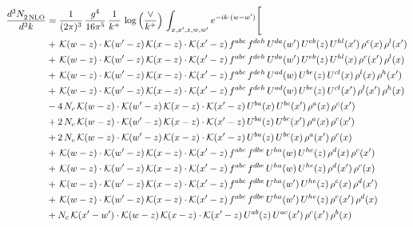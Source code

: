 \documentclass[9pt]{article}
\numberwithin{equation}{section}
\begin{document}
\begin{align}
    \frac{d^{3}N_{2\,\rm NLO}^{\rm}}{d^{3}k}  & = \frac{1}{(2\pi)^{3}}\,\frac{g^{4}}{16\pi^{5}}\,\frac{1}{k^{+}}\,\log{\left(\frac{\vee}{k^{+}}\right)}\, \int_{x,x',z,w,w'}e^{-ik\cdot (w-w')}\Bigg[\notag\\ &
    +\,\mathcal{K}(w-z)\cdot\mathcal{K}(w'-z)\,\mathcal{K}(x-z)\cdot\mathcal{K}(x'-z)\,f^{abc}\,f^{deh}\,U^{da}(w')\,U^{eb}(z)\,U^{hl}(x')\,\rho^{c}(x)\,\rho^{l}(x')\notag \\
&+\,\mathcal{K}(w-z)\cdot\mathcal{K}(w'-z)\,\mathcal{K}(x-z)\cdot\mathcal{K}(x'-z)\,f^{abc}\,f^{deh}\,U^{da}(w')\,U^{eb}(z)\,U^{hl}(x)\,\rho^{c}(x')\,\rho^{l}(x)\notag \\
&+\,\mathcal{K}(w-z)\cdot\mathcal{K}(w'-z)\,\mathcal{K}(x-z)\cdot\mathcal{K}(x'-z)\,f^{abc}\,f^{deh}\,U^{ad}(w)\,U^{be}(z)\,U^{cl}(x)\,\rho^{l}(x)\,\rho^{h}(x')\notag \\
&+\,\mathcal{K}(w-z)\cdot\mathcal{K}(w'-z)\,\mathcal{K}(x-z)\cdot\mathcal{K}(x'-z)\,f^{abc}\,f^{deh}\,U^{ad}(w)\,U^{be}(z)\,U^{cl}(x')\,\rho^{l}(x')\,\rho^{h}(x)\notag \\
&-4\,N_{c}\,\mathcal{K}(w-z)\cdot\mathcal{K}(w'-z)\,\mathcal{K}(x-z)\cdot\mathcal{K}(x'-z)\,U^{ba}(x)\,U^{bc}(x')\,\rho^{a}(x)\,\rho^{c}(x')\notag \\
&+2\,N_{c}\,\mathcal{K}(w-z)\cdot\mathcal{K}(w'-z)\,\mathcal{K}(x-z)\cdot\mathcal{K}(x'-z)\,U^{ba}(z)\,U^{bc}(x')\,\rho^{a}(x)\,\rho^{c}(x')\notag \\
&+2\,N_{c}\,\mathcal{K}(w-z)\cdot\mathcal{K}(w'-z)\,\mathcal{K}(x-z)\cdot\mathcal{K}(x'-z)\,U^{ba}(z)\,U^{bc}(x)\,\rho^{a}(x')\,\rho^{c}(x)\notag \\
&+\,\mathcal{K}(w-z)\cdot\mathcal{K}(w'-z)\,\mathcal{K}(x-z)\cdot\mathcal{K}(x'-z)\,f^{abc}\,f^{dbe}\,U^{ha}(w)\,U^{he}(z)\,\rho^{d}(x)\,\rho^{c}(x')\notag \\
&+\,\mathcal{K}(w-z)\cdot\mathcal{K}(w'-z)\,\mathcal{K}(x-z)\cdot\mathcal{K}(x'-z)\,f^{abc}\,f^{dbe}\,U^{ha}(w)\,U^{he}(z)\,\rho^{d}(x')\,\rho^{c}(x)\notag \\
&+\,\mathcal{K}(w-z)\cdot\mathcal{K}(w'-z)\,\mathcal{K}(x-z)\cdot\mathcal{K}(x'-z)\,f^{abc}\,f^{dbe}\,U^{ha}(w')\,U^{he}(z)\,\rho^{c}(x)\,\rho^{d}(x')\notag \\
&+\,\mathcal{K}(w-z)\cdot\mathcal{K}(w'-z)\,\mathcal{K}(x-z)\cdot\mathcal{K}(x'-z)\,f^{abc}\,f^{dbe}\,U^{ha}(w')\,U^{he}(z)\,\rho^{c}(x')\,\rho^{d}(x)\notag \\
&+N_{c}\,\mathcal{K}(x'-w')\cdot\mathcal{K}(w-z)\,\mathcal{K}(x-z)\cdot\mathcal{K}(x'-z)\,U^{ab}(z)\,U^{ac}(x')\,\rho^{c}(x')\,\rho^{b}(x)\notag \\

\end{align}
\end{document}
